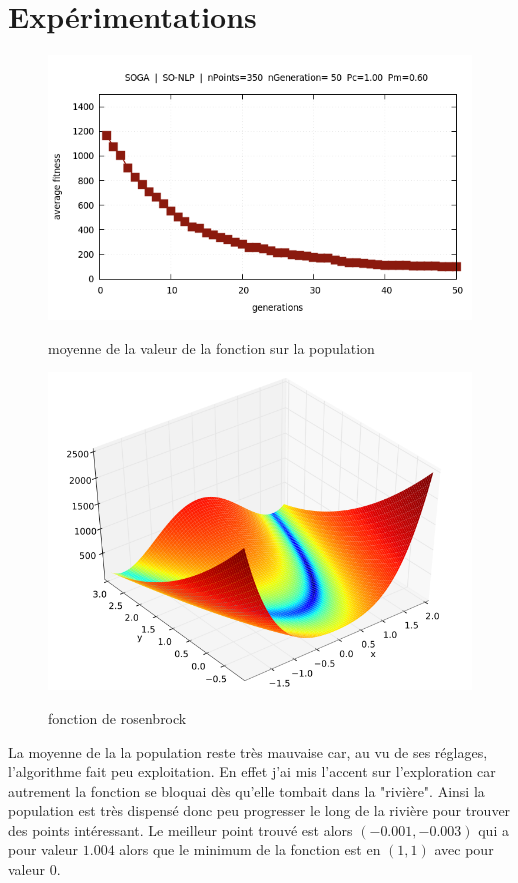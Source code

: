 \documentclass[12pt,a4paper]{article}
\begin{document}
\newpage

\section{Expérimentations}
\begin{figure}[h]
	\centering
	\includegraphics[scale=0.6]{resultat}
	\label{resultat}
	\caption{moyenne de la valeur de la fonction sur la population}
\end{figure}

\begin{figure}[h!]
	\centering
	\includegraphics[scale=0.5]{rosenbrock}
	\label{rosenbrock}
	\caption{fonction de rosenbrock}
\end{figure}

\newpage

La moyenne de la la population reste très mauvaise car, au vu de ses réglages, l'algorithme fait peu exploitation. En effet j'ai mis l’accent sur l'exploration car autrement la fonction se bloquai dès qu'elle tombait dans la "rivière". Ainsi la population est très dispensé donc peu progresser le long de la rivière pour trouver des points intéressant. Le meilleur point trouvé est alors $(-0.001 , -0.003 )$ qui a pour valeur $1.004$ alors que le minimum de la fonction est en $(1 , 1)$ avec pour valeur $0$.\\
\end{document}
